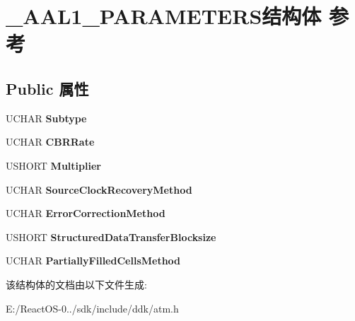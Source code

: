 \hypertarget{struct___a_a_l1___p_a_r_a_m_e_t_e_r_s}{}\section{\+\_\+\+A\+A\+L1\+\_\+\+P\+A\+R\+A\+M\+E\+T\+E\+R\+S结构体 参考}
\label{struct___a_a_l1___p_a_r_a_m_e_t_e_r_s}
\subsection*{Public 属性}
\begin{DoxyCompactItemize}
\item 
\mbox{\label{struct___a_a_l1___p_a_r_a_m_e_t_e_r_s_ab6f15c7c92f76ecfab7bda620bfc61e4}} 
U\+C\+H\+AR {\bfseries Subtype}
\item 
\mbox{\label{struct___a_a_l1___p_a_r_a_m_e_t_e_r_s_a2e92592daaf4abea2c1ec5a340546cea}} 
U\+C\+H\+AR {\bfseries C\+B\+R\+Rate}
\item 
\mbox{\label{struct___a_a_l1___p_a_r_a_m_e_t_e_r_s_ac63313512a8a21c6beaa1799faa70f8b}} 
U\+S\+H\+O\+RT {\bfseries Multiplier}
\item 
\mbox{\label{struct___a_a_l1___p_a_r_a_m_e_t_e_r_s_a6f0bcfe95d0d7da594c1afac65e1beb4}} 
U\+C\+H\+AR {\bfseries Source\+Clock\+Recovery\+Method}
\item 
\mbox{\label{struct___a_a_l1___p_a_r_a_m_e_t_e_r_s_a62161d3c5d8210cc08343c02ade6da1a}} 
U\+C\+H\+AR {\bfseries Error\+Correction\+Method}
\item 
\mbox{\label{struct___a_a_l1___p_a_r_a_m_e_t_e_r_s_a6faefad8034bf4d8d46d32a9426d3864}} 
U\+S\+H\+O\+RT {\bfseries Structured\+Data\+Transfer\+Blocksize}
\item 
\mbox{\label{struct___a_a_l1___p_a_r_a_m_e_t_e_r_s_a385edcff5f804c42d68e491db2d871fa}} 
U\+C\+H\+AR {\bfseries Partially\+Filled\+Cells\+Method}
\end{DoxyCompactItemize}


该结构体的文档由以下文件生成\+:\begin{DoxyCompactItemize}
\item 
E\+:/\+React\+O\+S-\/0../sdk/include/ddk/atm.\+h\end{DoxyCompactItemize}
